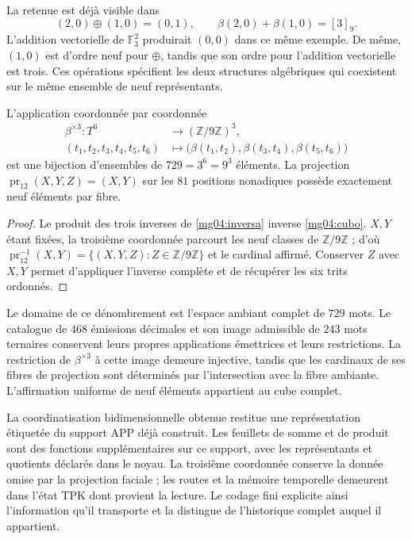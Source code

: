 La retenue est déjà visible dans
\[
 (2,0)\oplus(1,0)=(0,1),\qquad
 \beta(2,0)+\beta(1,0)=[3]_9.
\]
L'addition vectorielle de \(\mathbb F_3^2\) produirait \((0,0)\)
dans ce même exemple. De même, \((1,0)\) est d'ordre neuf pour
\(\oplus\), tandis que son ordre pour l'addition vectorielle est trois.
Ces opérations spécifient les deux structures algébriques qui
coexistent sur le même ensemble de neuf représentants.

\begin{corollary}
L'application coordonnée par coordonnée
\begin{equation}
 \begin{split}
 \beta^{\times3}:T^6&\longrightarrow(\mathbb Z/9\mathbb Z)^3,\\
 (t_1,t_2,t_3,t_4,t_5,t_6)&\longmapsto
 \bigl(\beta(t_1,t_2),\beta(t_3,t_4),\beta(t_5,t_6)\bigr)
 \end{split}
 \label{mg04:cubo}
\end{equation}
est une bijection d'ensembles de \(729=3^6=9^3\) éléments. La
projection \(\operatorname{pr}_{12}(X,Y,Z)=(X,Y)\) sur les
\(81\) positions nonadiques possède exactement neuf éléments
par fibre.
\end{corollary}

\begin{proof}
Le produit des trois inverses de \eqref{mg04:inversa} inverse \eqref{mg04:cubo}. \(X,Y\) étant fixées, la troisième coordonnée parcourt les neuf classes de \(\mathbb Z/9\mathbb Z\) ; d'où \(\operatorname{pr}_{12}^{-1}(X,Y)=
\{(X,Y,Z):Z\in\mathbb Z/9\mathbb Z\}\) et le cardinal affirmé. Conserver \(Z\) avec \(X,Y\) permet d'appliquer l'inverse complète et de récupérer les six trits ordonnés.
\end{proof}

Le domaine de ce dénombrement est l'espace ambiant complet de \(729\)
mots. Le catalogue de \(468\) émissions décimales et son image
admissible de \(243\) mots ternaires conservent leurs propres applications
émettrices et leurs restrictions. La restriction de \(\beta^{\times3}\)
à cette image demeure injective, tandis que les cardinaux de
ses fibres de projection sont déterminés par l'intersection avec la
fibre ambiante. L'affirmation uniforme de neuf éléments appartient
au cube complet.

La coordinatisation bidimensionnelle obtenue restitue une représentation étiquetée
du support APP déjà construit. Les feuillets de somme et de produit sont des fonctions supplémentaires sur
ce support, avec les représentants et quotients déclarés dans le noyau.
La troisième coordonnée conserve la donnée omise par la projection
faciale ; les routes et la mémoire temporelle demeurent dans l'état TPK
dont provient la lecture. Le codage fini
explicite ainsi l'information qu'il transporte et la distingue de l'historique
complet auquel il appartient.
